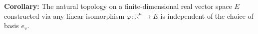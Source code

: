 \textbf{Corollary:} The natural topology on a finite-dimensional real vector space $E$ constructed via any linear isomorphism $\varphi: \mathbb{R}^n \to E$ is independent of the choice of basis $e_v$.
